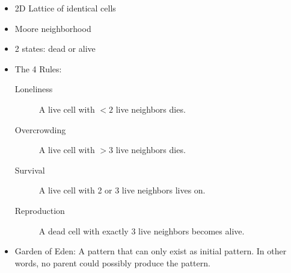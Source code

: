 \begin{itemize}
    \item 2D Lattice of identical cells 
    \item Moore neighborhood
    \item 2 states: dead or alive
    \item The 4 Rules:
    \begin{description}
        \item[Loneliness] A live cell with $<2$ live neighbors dies.
        \item[Overcrowding] A live cell with $>3$ live neighbors dies.
        \item[Survival] A live cell with 2 or 3 live neighbors lives on.
        \item[Reproduction] A dead cell with exactly 3 live neighbors becomes alive.
    \end{description}
    \item Garden of Eden: A pattern that can only exist as initial pattern. In other
words, no parent could possibly produce the pattern.
\end{itemize}
